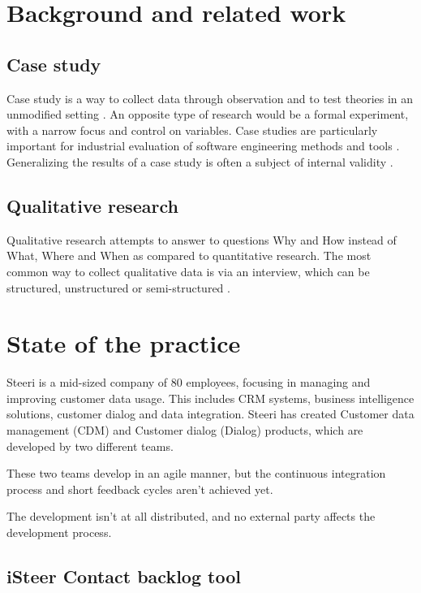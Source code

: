 \documentclass[english]{tktltiki2}
\theoremstyle{definition}
\theoremstyle{remark}
\begin{document}
\section{Background and related work}

\subsection{Case study}
Case study is a way to collect data through observation and to test theories in an unmodified setting \cite{zelkowitz1998experimental}. An opposite type of research would be a formal experiment, with a narrow focus and control on variables. Case studies are particularly important for industrial evaluation of software engineering methods and tools \cite{kitchenham1995case}. Generalizing the results of a case study is often a subject of internal validity \cite{TODO}. 

\subsection{Qualitative research}
Qualitative research attempts to answer to questions Why and How instead of What, Where and When as compared to quantitative research. The most common way to collect qualitative data is via an interview, which can be structured, unstructured or semi-structured \cite{Qualitative Methods in Empirical Studies of Software Engineering}. 

\section{State of the practice}	
Steeri is a mid-sized company of 80 employees, focusing in managing and improving customer data usage. This includes CRM systems, business intelligence solutions, customer dialog and data integration. Steeri has created Customer data management (CDM) and Customer dialog (Dialog) products, which are developed by two different teams. 

These two teams develop in an agile manner, but the continuous integration process \cite{fowler2006continuous} and short feedback cycles aren't achieved yet. 

The development isn't at all distributed, and no external party affects the development process. 

\subsection{iSteer Contact backlog tool}
\end{document}
